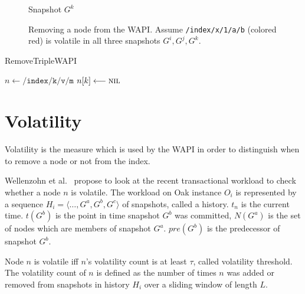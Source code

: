 \documentclass[abstracton,12pt]{scrreprt}
\begin{document}
\begin{figure}[h]
\begin{scriptsize}
\begin{multicols}{3}
\begin{center}
                Snapshot $G^k$
            \end{center}
        \end{multicols}
    \end{scriptsize}
    \caption{Removing a node from the WAPI. Assume \texttt{/index/x/1/a/b} (colored red) is volatile in all three snapshots $G^i, G^j, G^k$.}
    \label{fig:remove_wapi}
\end{figure}

\begin{algorithm}[H]
    \label{algo:remove_triple_wapi}
    \caption{RemoveTripleWAPI}
    \DontPrintSemicolon
    \begin{footnotesize}
        $n \longleftarrow \texttt{/index/k/v/m}$\;
        $n[k] \longleftarrow \textsc{nil}$\;
    \end{footnotesize}
\end{algorithm}

\chapter{Volatility}
\label{ch:volatility}

Volatility is the measure which is used by the WAPI in order to distinguish when to remove a node or not from the index.

Wellenzohn et al.~\cite{KW17} propose to look at the recent transactional
workload to check whether a node $n$ is volatile. The workload on Oak instance
$O_i$ is represented by a sequence $H_i = \langle \ldots, G^a, G^b, G^c
\rangle$ of snapshots, called a history.  $t_n$ is the current time.  $t(G^b)$
is the point in time snapshot $G^b$ was committed, $N(G^a)$ is the set of
nodes which are members of snapshot $G^a$.  $pre(G^b)$ is the predecessor of
snapshot $G^b$.

Node $n$ is volatile iff $n$'s volatility count is at least $\tau$, called volatility threshold.
The volatility count of $n$ is defined as the number of times $n$ was added or removed from snapshots in history $H_i$ over a sliding window of length $L$.
\end{document}

